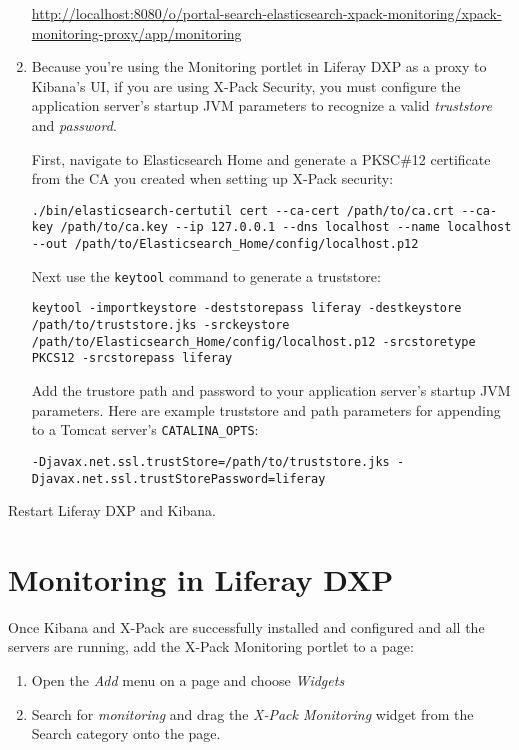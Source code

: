 \begin{enumerate}
  \url{http://localhost:8080/o/portal-search-elasticsearch-xpack-monitoring/xpack-monitoring-proxy/app/monitoring}
\item
  Because you're using the Monitoring portlet in Liferay DXP as a proxy
  to Kibana's UI, if you are using X-Pack Security, you must configure
  the application server's startup JVM parameters to recognize a valid
  \emph{truststore} and \emph{password}.

  First, navigate to Elasticsearch Home and generate a PKSC\#12
  certificate from the CA you created when setting up X-Pack security:

\begin{verbatim}
./bin/elasticsearch-certutil cert --ca-cert /path/to/ca.crt --ca-key /path/to/ca.key --ip 127.0.0.1 --dns localhost --name localhost --out /path/to/Elasticsearch_Home/config/localhost.p12
\end{verbatim}

  Next use the \texttt{keytool} command to generate a truststore:

\begin{verbatim}
keytool -importkeystore -deststorepass liferay -destkeystore /path/to/truststore.jks -srckeystore /path/to/Elasticsearch_Home/config/localhost.p12 -srcstoretype PKCS12 -srcstorepass liferay
\end{verbatim}

  Add the trustore path and password to your application server's
  startup JVM parameters. Here are example truststore and path
  parameters for appending to a Tomcat server's \texttt{CATALINA\_OPTS}:

\begin{verbatim}
-Djavax.net.ssl.trustStore=/path/to/truststore.jks -Djavax.net.ssl.trustStorePassword=liferay
\end{verbatim}
\end{enumerate}

Restart Liferay DXP and Kibana.

\section{Monitoring in Liferay DXP}\label{monitoring-in-liferay-dxp}

Once Kibana and X-Pack are successfully installed and configured and all
the servers are running, add the X-Pack Monitoring portlet to a page:

\begin{enumerate}
\def\labelenumi{\arabic{enumi}.}
\item
  Open the \emph{Add} menu on a page and choose \emph{Widgets}
\item
  Search for \emph{monitoring} and drag the \emph{X-Pack Monitoring}
  widget from the Search category onto the page.
\end{enumerate}

